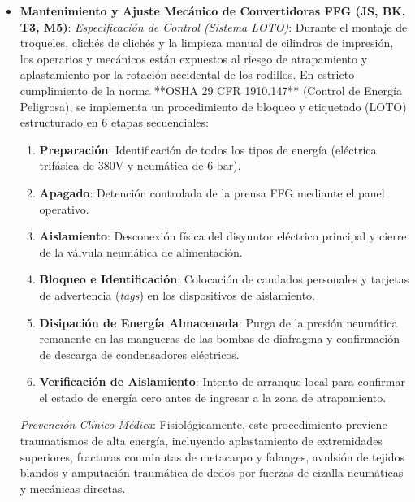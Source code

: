 \documentclass[11pt, letterpaper]{article}
\begin{document}
\begin{itemize}
    \item \textbf{Mantenimiento y Ajuste Mecánico de Convertidoras FFG (JS, BK, T3, M5)}: 
    \textit{Especificación de Control (Sistema LOTO)}: Durante el montaje de troqueles, clichés de clichés y la limpieza manual de cilindros de impresión, los operarios y mecánicos están expuestos al riesgo de atrapamiento y aplastamiento por la rotación accidental de los rodillos. En estricto cumplimiento de la norma **OSHA 29 CFR 1910.147** (Control de Energía Peligrosa), se implementa un procedimiento de bloqueo y etiquetado (LOTO) estructurado en 6 etapas secuenciales:
    \begin{enumerate}
        \item \textbf{Preparación}: Identificación de todos los tipos de energía (eléctrica trifásica de 380V y neumática de 6 bar).
        \item \textbf{Apagado}: Detención controlada de la prensa FFG mediante el panel operativo.
        \item \textbf{Aislamiento}: Desconexión física del disyuntor eléctrico principal y cierre de la válvula neumática de alimentación.
        \item \textbf{Bloqueo e Identificación}: Colocación de candados personales y tarjetas de advertencia (\textit{tags}) en los dispositivos de aislamiento.
        \item \textbf{Disipación de Energía Almacenada}: Purga de la presión neumática remanente en las mangueras de las bombas de diafragma y confirmación de descarga de condensadores eléctricos.
        \item \textbf{Verificación de Aislamiento}: Intento de arranque local para confirmar el estado de energía cero antes de ingresar a la zona de atrapamiento.
    \end{enumerate}
    \textit{Prevención Clínico-Médica}: Fisiológicamente, este procedimiento previene traumatismos de alta energía, incluyendo aplastamiento de extremidades superiores, fracturas conminutas de metacarpo y falanges, avulsión de tejidos blandos y amputación traumática de dedos por fuerzas de cizalla neumáticas y mecánicas directas.
    

\end{itemize}
\end{document}
